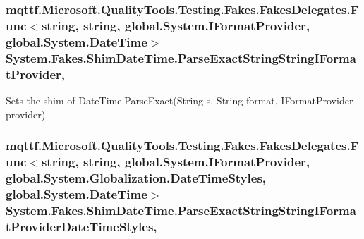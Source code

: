 \hypertarget{class_system_1_1_fakes_1_1_shim_date_time_a646e5d45d08ac80797d17f6f78e2c936}{
\subsubsection[{Parse\-Exact\-String\-String\-I\-Format\-Provider}]{\setlength{\rightskip}{0pt plus 5cm}mqttf.\-Microsoft.\-Quality\-Tools.\-Testing.\-Fakes.\-Fakes\-Delegates.\-Func$<$string, string, global.\-System.\-I\-Format\-Provider, global.\-System.\-Date\-Time$>$ System.\-Fakes.\-Shim\-Date\-Time.\-Parse\-Exact\-String\-String\-I\-Format\-Provider\hspace{0.3cm}{\ttfamily [static]}, {\ttfamily [set]}}}\label{class_system_1_1_fakes_1_1_shim_date_time_a646e5d45d08ac80797d17f6f78e2c936}


Sets the shim of Date\-Time.\-Parse\-Exact(\-String s, String format, I\-Format\-Provider provider)

\hypertarget{class_system_1_1_fakes_1_1_shim_date_time_a3637a499fdc58f19ca8cedb684da3c5a}{
\subsubsection[{Parse\-Exact\-String\-String\-I\-Format\-Provider\-Date\-Time\-Styles}]{\setlength{\rightskip}{0pt plus 5cm}mqttf.\-Microsoft.\-Quality\-Tools.\-Testing.\-Fakes.\-Fakes\-Delegates.\-Func$<$string, string, global.\-System.\-I\-Format\-Provider, global.\-System.\-Globalization.\-Date\-Time\-Styles, global.\-System.\-Date\-Time$>$ System.\-Fakes.\-Shim\-Date\-Time.\-Parse\-Exact\-String\-String\-I\-Format\-Provider\-Date\-Time\-Styles\hspace{0.3cm}{\ttfamily [static]}, {\ttfamily [set]}}}\label{class_system_1_1_fakes_1_1_shim_date_time_a3637a499fdc58f19ca8cedb684da3c5a}


